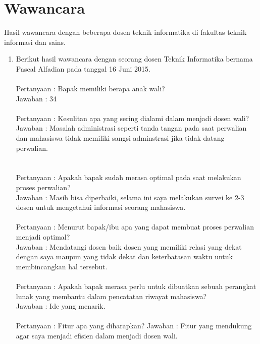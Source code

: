 \chapter{Wawancara}
\label{wawancara}

Hasil wawancara dengan beberapa dosen teknik informatika di fakultas teknik informasi dan sains.

\begin{enumerate}
\item Berikut hasil wawancara dengan seorang dosen Teknik Informatika bernama Pascal Alfadian pada tanggal 16 Juni 2015.\\\\
Pertanyaan : Bapak memiliki berapa anak wali?\\
Jawaban : 34\\\\
Pertanyaan : Kesulitan apa yang sering dialami dalam menjadi dosen wali?\\
Jawaban : Masalah administrasi seperti tanda tangan pada saat perwalian dan mahasiswa tidak memiliki sangsi adminstrasi jika tidak datang perwalian.\\\\\\
Pertanyaan : Apakah bapak sudah merasa optimal pada saat melakukan proses perwalian?\\
Jawaban : Masih bisa diperbaiki, selama ini saya melakukan survei ke 2-3 dosen untuk mengetahui informasi seorang mahasiswa.\\\\
Pertanyaan : Menurut bapak/ibu apa yang dapat membuat proses perwalian menjadi optimal?\\
Jawaban : Mendatangi dosen baik dosen yang memiliki relasi yang dekat dengan saya maupun yang tidak dekat dan keterbatasan waktu untuk membincangkan hal tersebut.\\\\
Pertanyaan : Apakah bapak merasa perlu untuk dibuatkan sebuah perangkat lunak yang membantu dalam pencatatan riwayat mahasiswa?\\
Jawaban : Ide yang menarik.\\\\
Pertanyaan : Fitur apa yang diharapkan?
Jawaban : Fitur yang mendukung agar saya menjadi efisien dalam menjadi dosen wali.\\


\end{enumerate}
